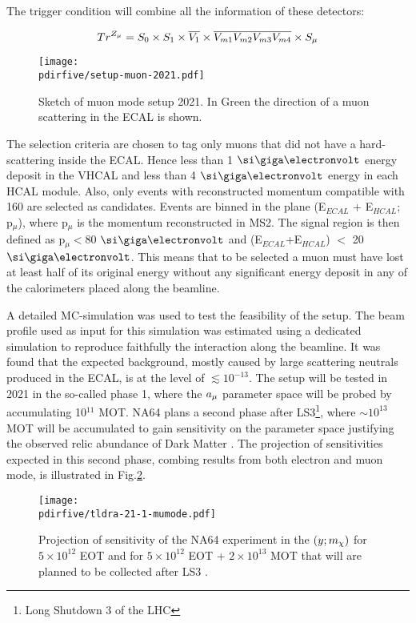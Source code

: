The trigger condition will combine all the information of these detectors:

\begin{equation}
\label{eq:trigger-mumode}
Tr^{Z_{\mu}} = S_0 \times S_1 \times \overline{V_1} \times \overline{V_{m1}}\overline{V_{m2}}\overline{V_{m3}}\overline{V_{m4}}\times S_{\mu}
\end{equation}

\begin{figure}[bth!]
  \centering
  \texttt{[image: \\pdirfive/setup-muon-2021.pdf]}
  \caption[Sketch of muon mode setup 2021]{Sketch of muon mode setup 2021. In Green the direction of a muon scattering in the ECAL is shown.}
  \label{fig:muon-mode-setup}
\end{figure}

The selection criteria are chosen to tag only muons that did not have a hard-scattering inside the ECAL. Hence less than 1 $\gev$ energy deposit in the VHCAL and less than 4 $\gev$ energy in each HCAL module. Also, only events with reconstructed momentum compatible with 160 \gev are selected as candidates. Events are binned in the plane (E$_{ECAL}$ + E$_{HCAL}$; p$_{\mu}$), where p$_{\mu}$ is the momentum reconstructed in MS2. The signal region is then defined as p$_{\mu} <$80 $\gev$ and (E$_{ECAL}$+E$_{HCAL}$) $<$ 20 $\gev$. This means that to be selected a muon must have lost at least half of its original energy without any significant energy deposit in any of the calorimeters placed along the beamline.

A detailed MC-simulation was used to test the feasibility of the setup. The beam profile used as input for this simulation was estimated using a dedicated simulation to reproduce faithfully the interaction along the beamline. It was found that the expected background, mostly caused by large scattering neutrals produced in the ECAL, is at the level of $\lesssim 10^{-13}$. The setup will be tested in 2021 in the so-called phase 1, where the $a_{\mu}$ parameter space will be probed by accumulating 10$^{11}$ MOT. NA64 plans a second phase after LS3\footnote{Long Shutdown 3 of the LHC}, where $\sim 10^{13}$ MOT will be accumulated to gain sensitivity on the parameter space justifying the observed relic abundance of Dark Matter \cite{Gninenko:2640930}. The projection of sensitivities expected in this second phase, combing results from both electron and muon mode, is illustrated in Fig.\ref{fig:dmyplane-mumode}.

\begin{figure}[bth!]
  \centering
  \texttt{[image: \\pdirfive/tldra-21-1-mumode.pdf]}
  \caption[sensitivity projection for invisible mode + muon mode 2021]{Projection of sensitivity of the NA64 experiment in the $(y;m_{\chi})$ for $5 \times 10^{12}$ EOT and for $5 \times 10^{12}$ EOT + $2 \times 10^{13}$ MOT that will are planned to be collected after LS3 \cite{Gninenko:2019qiv}.}
  \label{fig:dmyplane-mumode}
\end{figure}



